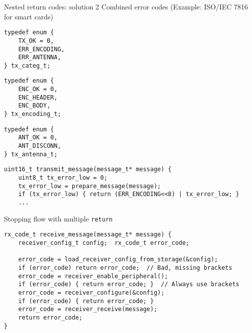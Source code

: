 \documentclass[aspectratio=169,14pt]{beamer}
\begin{document}
\begin{frame}[fragile]{Nested return codes: solution 2}
Combined error codes (Example: ISO/IEC 7816 for smart cards)

\begin{minipage}[t]{0.3\textwidth}
\begin{lstlisting}[style=cstyle]
typedef enum {
    TX_OK = 0,
    ERR_ENCODING,
    ERR_ANTENNA,
} tx_categ_t;
\end{lstlisting}
\end{minipage}
\begin{minipage}[t]{0.3\textwidth}
\begin{lstlisting}[style=cstyle]
typedef enum {
    ENC_OK = 0,
    ENC_HEADER,
    ENC_BODY,
} tx_encoding_t;
\end{lstlisting}
\end{minipage}
\begin{minipage}[t]{0.3\textwidth}
\begin{lstlisting}[style=cstyle]
typedef enum {
    ANT_OK = 0,
    ANT_DISCONN,
} tx_antenna_t;
\end{lstlisting}
\end{minipage}

\begin{lstlisting}[style=cstyle]
uint16_t transmit_message(message_t* message) {
    uint8_t tx_error_low = 0;
    tx_error_low = prepare_message(message);
    if (tx_error_low) { return (ERR_ENCODING<<8) | tx_error_low; }
    ...
\end{lstlisting}
\end{frame}



\begin{frame}[fragile]{Stopping flow with multiple \texttt{return}}
\begin{lstlisting}[style=cstyle]
rx_code_t receive_message(message_t* message) {
    receiver_config_t config;  rx_code_t error_code;
    
    error_code = load_receiver_config_from_storage(&config);
    if (error_code) return error_code;  // Bad, missing brackets
    error_code = receiver_enable_peripheral();
    if (error_code) { return error_code; }  // Always use brackets
    error_code = receiver_configure(&config);
    if (error_code) { return error_code; }
    error_code = receiver_receive(message);
    return error_code;
}
\end{lstlisting}
\end{frame}
\end{document}
